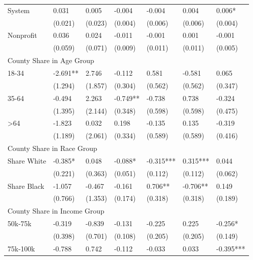 \documentclass[12pt]{article}
\begin{document}
{\begin{tabular}{lllllll}
\hspace{0.1in}System    	&	0.031	&	0.005	&	-0.004	&	-0.004	&	0.004	&	0.006*	\\
        	&	(0.021)	&	(0.023)	&	(0.004)	&	(0.006)	&	(0.006)	&	(0.004)	\\
\hspace{0.1in}Nonprofit 	&	0.036	&	0.024	&	-0.011	&	-0.001	&	0.001	&	-0.001	\\
        	&	(0.059)	&	(0.071)	&	(0.009)	&	(0.011)	&	(0.011)	&	(0.005)	\\
\multicolumn{7}{l}{County Share in Age Group}\\													
\hspace{0.1in}18-34     	&	-2.691**	&	2.746	&	-0.112	&	0.581	&	-0.581	&	0.065	\\
        	&	(1.294)	&	(1.857)	&	(0.304)	&	(0.562)	&	(0.562)	&	(0.347)	\\
\hspace{0.1in}35-64     	&	-0.494	&	2.263	&	-0.749**	&	-0.738	&	0.738	&	-0.324	\\
        	&	(1.395)	&	(2.144)	&	(0.348)	&	(0.598)	&	(0.598)	&	(0.475)	\\
\hspace{0.1in}>64       	&	-1.823	&	0.032	&	0.198	&	-0.135	&	0.135	&	-0.319	\\
        	&	(1.189)	&	(2.061)	&	(0.334)	&	(0.589)&	(0.589)	&	(0.416)	\\
\multicolumn{7}{l}{County Share in Race Group}\\	
\hspace{0.1in}Share White     	&	-0.385*	&	0.048	&	-0.088*	&	-0.315***	&	0.315***	&	0.044	\\
        	&	(0.221)	&	(0.363)	&	(0.051)	&	(0.112)	&	(0.112)	&	(0.062)	\\
\hspace{0.1in}Share Black     	&	-1.057	&	-0.467	&	-0.161	&	0.706**	&	-0.706**	&	0.149	\\
        	&	(0.766)	&	(1.353)&	(0.174)	&	(0.318)	&	(0.318)	&	(0.189)	\\
\multicolumn{7}{l}{County Share in Income Group}\\												
\hspace{0.1in}50k-75k   	&	-0.319	&	-0.839	&	-0.131	&	-0.225	&	0.225	&	-0.256*	\\
        	&	(0.398)	&	(0.701)	&	(0.108)	&	(0.205)	&	(0.205)	&	(0.149)	\\
\hspace{0.1in}75k-100k  	&	-0.788	&	0.742	&	-0.112	&	-0.033	&	0.033	&	-0.395***	\\

\end{tabular}}
\end{document}
